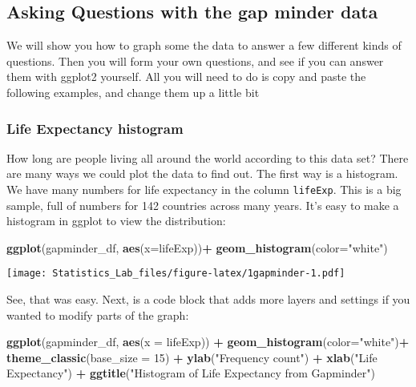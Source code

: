 \documentclass[
]{book}
\newenvironment{Shaded}{\begin{snugshade}}{\end{snugshade}}
\newcommand{\AttributeTok}[1]{\textcolor[rgb]{0.13,0.29,0.53}{#1}}
\newcommand{\DecValTok}[1]{\textcolor[rgb]{0.00,0.00,0.81}{#1}}
\newcommand{\FunctionTok}[1]{\textcolor[rgb]{0.13,0.29,0.53}{\textbf{#1}}}
\newcommand{\NormalTok}[1]{#1}
\newcommand{\SpecialCharTok}[1]{\textcolor[rgb]{0.81,0.36,0.00}{\textbf{#1}}}
\newcommand{\StringTok}[1]{\textcolor[rgb]{0.31,0.60,0.02}{#1}}
\begin{document}
\hypertarget{asking-questions-with-the-gap-minder-data}{%
\subsection{Asking Questions with the gap minder data}\label{asking-questions-with-the-gap-minder-data}}

We will show you how to graph some the data to answer a few different kinds of questions. Then you will form your own questions, and see if you can answer them with ggplot2 yourself. All you will need to do is copy and paste the following examples, and change them up a little bit

\hypertarget{life-expectancy-histogram}{%
\subsubsection{Life Expectancy histogram}\label{life-expectancy-histogram}}

How long are people living all around the world according to this data set? There are many ways we could plot the data to find out. The first way is a histogram. We have many numbers for life expectancy in the column \texttt{lifeExp}. This is a big sample, full of numbers for 142 countries across many years. It's easy to make a histogram in ggplot to view the distribution:

\begin{Shaded}
\begin{Highlighting}[]
\FunctionTok{ggplot}\NormalTok{(gapminder\_df, }\FunctionTok{aes}\NormalTok{(}\AttributeTok{x=}\NormalTok{lifeExp))}\SpecialCharTok{+}
  \FunctionTok{geom\_histogram}\NormalTok{(}\AttributeTok{color=}\StringTok{"white"}\NormalTok{)}
\end{Highlighting}
\end{Shaded}

\texttt{[image: Statistics\_Lab\_files/figure-latex/1gapminder-1.pdf]}

See, that was easy. Next, is a code block that adds more layers and settings if you wanted to modify parts of the graph:

\begin{Shaded}
\begin{Highlighting}[]
\FunctionTok{ggplot}\NormalTok{(gapminder\_df, }\FunctionTok{aes}\NormalTok{(}\AttributeTok{x =}\NormalTok{ lifeExp)) }\SpecialCharTok{+}
  \FunctionTok{geom\_histogram}\NormalTok{(}\AttributeTok{color=}\StringTok{"white"}\NormalTok{)}\SpecialCharTok{+} 
  \FunctionTok{theme\_classic}\NormalTok{(}\AttributeTok{base\_size =} \DecValTok{15}\NormalTok{) }\SpecialCharTok{+}
  \FunctionTok{ylab}\NormalTok{(}\StringTok{"Frequency count"}\NormalTok{) }\SpecialCharTok{+} 
  \FunctionTok{xlab}\NormalTok{(}\StringTok{"Life Expectancy"}\NormalTok{) }\SpecialCharTok{+}
  \FunctionTok{ggtitle}\NormalTok{(}\StringTok{"Histogram of Life Expectancy from Gapminder"}\NormalTok{)}
\end{Highlighting}
\end{Shaded}
\end{document}
